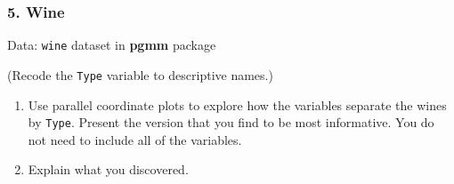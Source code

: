 \documentclass[]{article}
\begin{document}
\subsubsection{5. Wine}\label{wine}

Data: \texttt{wine} dataset in \textbf{pgmm} package

(Recode the \texttt{Type} variable to descriptive names.)

\begin{enumerate}
\def\labelenumi{(\alph{enumi})}
\item
  Use parallel coordinate plots to explore how the variables separate
  the wines by \texttt{Type}. Present the version that you find to be
  most informative. You do not need to include all of the variables.
\item
  Explain what you discovered.
\end{enumerate}
\end{document}
